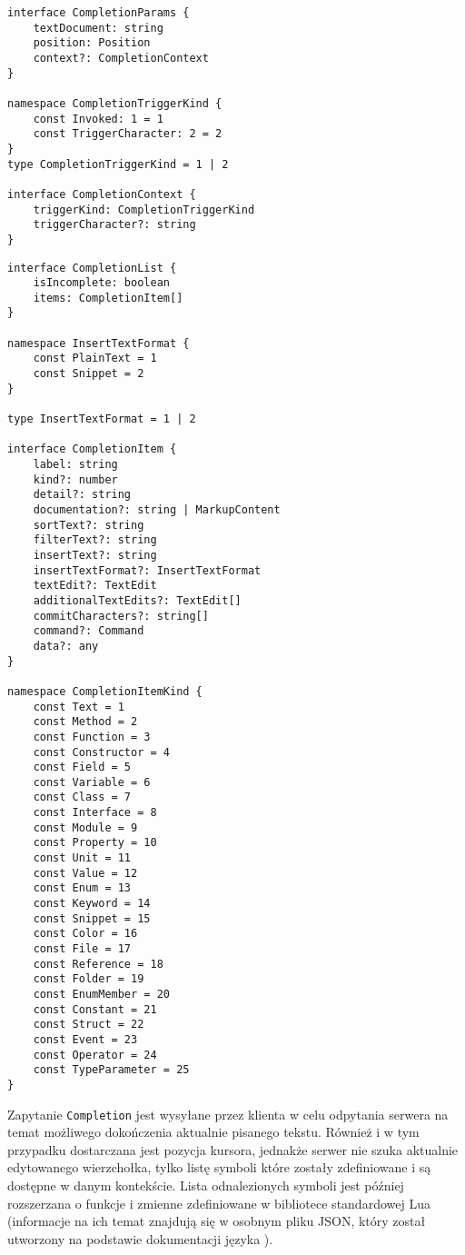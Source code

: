 \begin{lstlisting}[title=Struktura argumentu zapytania]
interface CompletionParams {
    textDocument: string
    position: Position
    context?: CompletionContext
}

namespace CompletionTriggerKind {
    const Invoked: 1 = 1
    const TriggerCharacter: 2 = 2
}
type CompletionTriggerKind = 1 | 2

interface CompletionContext {
    triggerKind: CompletionTriggerKind
    triggerCharacter?: string
}
\end{lstlisting}
\begin{lstlisting}[title=Struktura odpowiedzi]
interface CompletionList {
    isIncomplete: boolean
    items: CompletionItem[]
}

namespace InsertTextFormat {
    const PlainText = 1
    const Snippet = 2
}

type InsertTextFormat = 1 | 2

interface CompletionItem {
    label: string
    kind?: number
    detail?: string
    documentation?: string | MarkupContent
    sortText?: string
    filterText?: string
    insertText?: string
    insertTextFormat?: InsertTextFormat
    textEdit?: TextEdit
    additionalTextEdits?: TextEdit[]
    commitCharacters?: string[]
    command?: Command
    data?: any
}

namespace CompletionItemKind {
    const Text = 1
    const Method = 2
    const Function = 3
    const Constructor = 4
    const Field = 5
    const Variable = 6
    const Class = 7
    const Interface = 8
    const Module = 9
    const Property = 10
    const Unit = 11
    const Value = 12
    const Enum = 13
    const Keyword = 14
    const Snippet = 15
    const Color = 16
    const File = 17
    const Reference = 18
    const Folder = 19
    const EnumMember = 20
    const Constant = 21
    const Struct = 22
    const Event = 23
    const Operator = 24
    const TypeParameter = 25
}
\end{lstlisting}
Zapytanie \texttt{Completion} jest wysyłane przez klienta w celu odpytania serwera na temat możliwego dokończenia aktualnie pisanego tekstu. Również i w tym przypadku dostarczana jest pozycja kursora, jednakże serwer nie szuka aktualnie edytowanego wierzchołka, tylko listę symboli które zostały zdefiniowane i są dostępne w danym kontekście. Lista odnalezionych symboli jest później rozszerzana o funkcje i zmienne zdefiniowane w bibliotece standardowej Lua (informacje na ich temat znajdują się w osobnym pliku JSON, który został utworzony na podstawie dokumentacji języka \cite{lua_lib}).